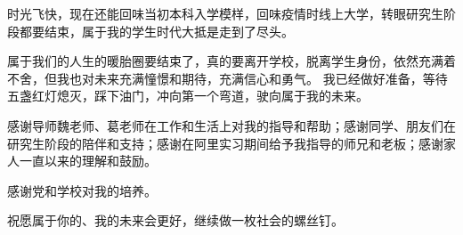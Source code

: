 \documentclass[
    type = master,
    degree = professional,
    twoside,
    fontset = win,
    decl-page = true
  ]{njuthesis}
\begin{document}









\printbibliography

\begin{acknowledgement}
      时光飞快，现在还能回味当初本科入学模样，回味疫情时线上大学，转眼研究生阶段都要结束，属于我的学生时代大抵是走到了尽头。

      属于我们的人生的暖胎圈要结束了，真的要离开学校，脱离学生身份，依然充满着不舍，但我也对未来充满憧憬和期待，充满信心和勇气。
      我已经做好准备，等待五盏红灯熄灭，踩下油门，冲向第一个弯道，驶向属于我的未来。

      感谢导师魏老师、葛老师在工作和生活上对我的指导和帮助；感谢同学、朋友们在研究生阶段的陪伴和支持；感谢在阿里实习期间给予我指导的师兄和老板；感谢家人一直以来的理解和鼓励。

      感谢党和学校对我的培养。

      祝愿属于你的、我的未来会更好，继续做一枚社会的螺丝钉。
\end{acknowledgement}

\appendix

\end{document}
